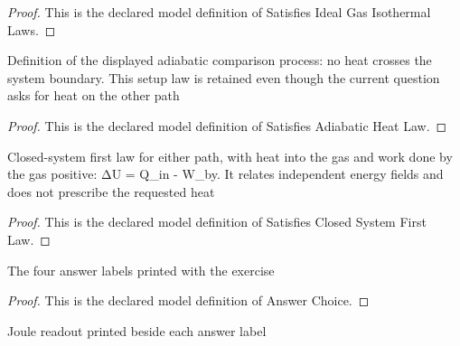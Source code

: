 \begin{proof}
  This is the declared model definition of Satisfies Ideal Gas Isothermal Laws.
\end{proof}
\begin{definition}
  \label{def:physics:phyx-mini-0410:phyxminiproblems-problemphyxmini0410-satisfiesadiabaticheatlaw}
  Definition of the displayed adiabatic comparison process: no heat crosses the system boundary. This setup law is retained even though the current question asks for heat on the other path
\end{definition}
\begin{proof}
  This is the declared model definition of Satisfies Adiabatic Heat Law.
\end{proof}
\begin{definition}
  \label{def:physics:phyx-mini-0410:phyxminiproblems-problemphyxmini0410-satisfiesclosedsystemfirstlaw}
  Closed-system first law for either path, with heat into the gas and work done by the gas positive: ΔU = Q\_in - W\_by. It relates independent energy fields and does not prescribe the requested heat
\end{definition}
\begin{proof}
  This is the declared model definition of Satisfies Closed System First Law.
\end{proof}
\begin{definition}
  \label{def:physics:phyx-mini-0410:phyxminiproblems-problemphyxmini0410-answerchoice}
  The four answer labels printed with the exercise
\end{definition}
\begin{proof}
  This is the declared model definition of Answer Choice.
\end{proof}
\begin{definition}
  \label{def:physics:phyx-mini-0410:phyxminiproblems-problemphyxmini0410-displayedheatjoules}
  Joule readout printed beside each answer label
\end{definition}
